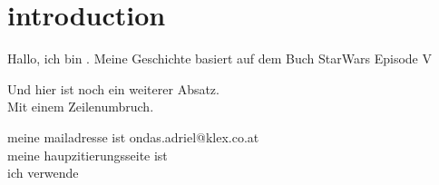\chapter{introduction}

Hallo, ich bin \@author. Meine Geschichte basiert auf dem Buch StarWars Episode V %

Und hier ist noch ein weiterer Absatz. \\
Mit einem Zeilenumbruch.

meine mailadresse ist ondas.adriel@klex.co.at\cite{KLEXKlusemannExtern}\\
meine haupzitierungsseite ist \cite{WikipediaFreieEnzyklopadie}\\
ich verwende \cite{ZoteroDownloads}